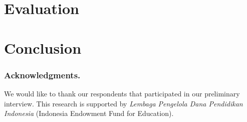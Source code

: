 \documentclass[runningheads,a4paper]{llncs}
\begin{document}
\section{Evaluation}

\section{Conclusion}
 

\subsubsection*{Acknowledgments.} We would like to thank our respondents that participated in our preliminary interview. This research is supported by \emph{Lembaga Pengelola Dana Pendidikan Indonesia} (Indonesia Endowment Fund for Education). 

 

\end{document}
